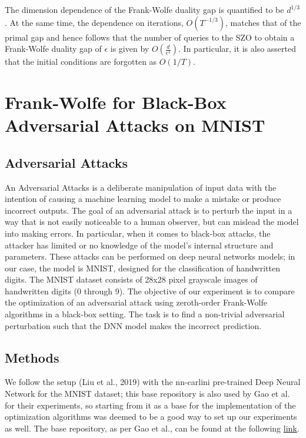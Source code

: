 \documentclass[10pt,twocolumn,letterpaper]{article}
\begin{document}
The dimension dependence of the Frank-Wolfe duality gap is quantified to be $d^{1 / 3}$.
At the same time, the dependence on iterations, $O\left(T^{-1 / 3}\right)$, matches
that of the primal gap and hence follows that the number of queries to the SZO to obtain a Frank-Wolfe 
duality gap of $\epsilon$ is given by $O\left(\frac{d}{\epsilon^{3}}\right)$. 
In particular, it is also asserted that the initial conditions 
are forgotten as $O(1 / T)$.

\section{Frank-Wolfe for Black-Box Adversarial Attacks on MNIST}

\subsection{Adversarial Attacks}

An Adversarial Attacks is a deliberate manipulation of input data with the 
intention of causing a machine learning model to make a mistake or produce 
incorrect outputs. The goal of an adversarial attack is to perturb 
the input in a way that is not easily noticeable to a human observer,
but can mislead the model into making errors. In particular, when it comes
to black-box attacks, the attacker has limited or no knowledge of the 
model's internal structure and parameters. These attacks can be performed on
deep neural networks models; in our case, the model is MNIST, designed for the
classification of handwritten digits. 
The MNIST dataset consists of 28x28 pixel grayscale images of handwritten digits (0 through 9).
The objective of our experiment is to compare the optimization of an adversarial attack using
zeroth-order Frank-Wolfe algorithms in a black-box setting.
The task is to find a non-trivial adversarial perturbation such that the DNN model
makes the incorrect prediction.

\subsection{Methods}

We follow the setup (Liu et al., 2019) with the nn-carlini pre-trained Deep Neural Network for
the MNIST dataset; this base repository is also used by Gao et al.\cite{Gao} for their experiments, so starting
from it as a base for the implementation of the optimization algorithms was deemed to be a good
way to set up our experiments as well. The base repository, as per Gao et al., can be found
at the following \href{https://github.com/IBM/ZOSVRG-BlackBox-Adv}{link}.
\end{document}
